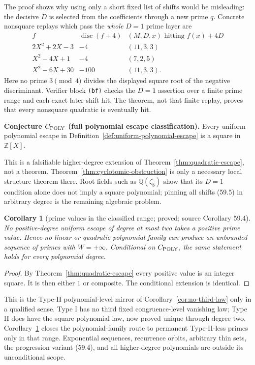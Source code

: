 \documentclass[10pt,reqno]{amsart}
\newtheorem{corollary}[theorem]{Corollary}
\theoremstyle{definition}
\newcommand{\1}{\mathbf 1}
\begin{document}
The proof shows why using only a short fixed list of shifts would be
misleading: the decisive $D$ is selected from the coefficients through a
new prime $q$.  Concrete nonsquare replays which pass the \emph{whole}
$D=1$ prime layer are
\begin{equation*}
\begin{array}{c|c|c}
f&\operatorname {disc}(f+4)&(M,D,x)\text{ hitting }f(x)+4D\\ \hline
2X^2+2X-3&-4&(11,3,3)\\
X^2-4X+1&-4&(7,2,5)\\
X^2-6X+30&-100&(11,3,3).
\end{array}
\end{equation*}
Here no prime $3\pmod4$ divides the displayed square root of the negative
discriminant.  Verifier block \texttt{(bf)} checks the $D=1$ assertion over
a finite prime range and each exact later-shift hit.  The theorem, not that
finite replay, proves that every nonsquare quadratic is eventually hit.

\medskip\noindent\textbf{Conjecture $C_{\rm POLY}$ (full polynomial escape
classification).}
Every uniform polynomial escape in Definition~\ref{def:uniform-polynomial-escape}
is a square in $\mathbb Z[X]$.

This is a falsifiable higher-degree extension of
Theorem~\ref{thm:quadratic-escape}, not a theorem.
Theorem~\ref{thm:cyclotomic-obstruction} is only a necessary local structure
theorem there.  Root fields such as $\mathbb Q(\zeta_8)$ show that its
$D=1$ condition alone does not imply a square polynomial; pinning all shifts
(59.5) in arbitrary degree is the remaining algebraic problem.

\begin{corollary}[prime values in the classified range; proved; source
Corollary 59.4]
\label{cor:polynomial-primes}
No positive-degree uniform escape of degree at most two takes a positive
prime value.  Hence no linear or quadratic polynomial family can produce an
unbounded sequence of primes with $W=+\infty$.  Conditional on
$C_{\rm POLY}$, the same statement holds for every polynomial degree.
\end{corollary}
\begin{proof}
By Theorem~\ref{thm:quadratic-escape} every positive value is an integer
square.  It is then either $1$ or composite.  The conditional extension is
identical.
\end{proof}

This is the Type-II polynomial-level mirror of Corollary~\ref{cor:no-third-law}
only in a qualified sense.  Type I has no third fixed congruence-level
vanishing law; Type II does have the square polynomial law, now proved
unique through degree two.  Corollary~\ref{cor:polynomial-primes} closes the
polynomial-family route to permanent Type-II-less primes only in that
range.  Exponential sequences, recurrence orbits, arbitrary thin sets, the
progression variant (59.4), and all higher-degree polynomials are outside
its unconditional scope.
\end{document}
